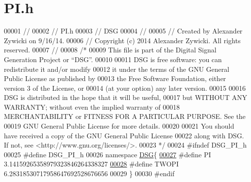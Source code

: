 \hypertarget{_p_i_8h_source}{\section{P\+I.\+h}
\label{_p_i_8h_source}
}

\begin{DoxyCode}
00001 \textcolor{comment}{//}
00002 \textcolor{comment}{//  PI.h}
00003 \textcolor{comment}{//  DSG}
00004 \textcolor{comment}{//}
00005 \textcolor{comment}{//  Created by Alexander Zywicki on 9/16/14.}
00006 \textcolor{comment}{//  Copyright (c) 2014 Alexander Zywicki. All rights reserved.}
00007 \textcolor{comment}{//}
00008 \textcolor{comment}{/*}
00009 \textcolor{comment}{ This file is part of the Digital Signal Generation Project or “DSG”.}
00010 \textcolor{comment}{}
00011 \textcolor{comment}{ DSG is free software: you can redistribute it and/or modify}
00012 \textcolor{comment}{ it under the terms of the GNU General Public License as published by}
00013 \textcolor{comment}{ the Free Software Foundation, either version 3 of the License, or}
00014 \textcolor{comment}{ (at your option) any later version.}
00015 \textcolor{comment}{}
00016 \textcolor{comment}{ DSG is distributed in the hope that it will be useful,}
00017 \textcolor{comment}{ but WITHOUT ANY WARRANTY; without even the implied warranty of}
00018 \textcolor{comment}{ MERCHANTABILITY or FITNESS FOR A PARTICULAR PURPOSE.  See the}
00019 \textcolor{comment}{ GNU General Public License for more details.}
00020 \textcolor{comment}{}
00021 \textcolor{comment}{ You should have received a copy of the GNU General Public License}
00022 \textcolor{comment}{ along with DSG.  If not, see <http://www.gnu.org/licenses/>.}
00023 \textcolor{comment}{ */}
00024 \textcolor{preprocessor}{#ifndef DSG\_PI\_h}
00025 \textcolor{preprocessor}{#define DSG\_PI\_h}
00026 \textcolor{keyword}{namespace }\hyperlink{namespace_d_s_g}{DSG}\{
\hypertarget{_p_i_8h_source_l00027}{}\hyperlink{_p_i_8h_a598a3330b3c21701223ee0ca14316eca}{00027} \textcolor{preprocessor}{#define PI    3.14159265358979323846264338327}
\hypertarget{_p_i_8h_source_l00028}{}\hyperlink{_p_i_8h_a4912c64aec0c943b7985db6cb61ff83a}{00028} \textcolor{preprocessor}{#define TWOPI 6.28318530717958647692528676656}
00029 \}
00030 \textcolor{preprocessor}{#endif}
\end{DoxyCode}
